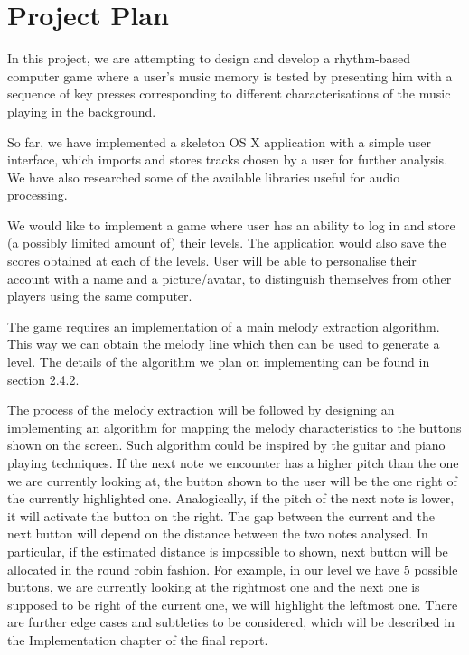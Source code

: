 
\chapter{Project Plan} %

\label{Chapter3} %




In this project, we are attempting to design and develop a rhythm-based computer game where a user's music memory is tested  by presenting him with a sequence of key presses corresponding to different characterisations of the music playing in the background.

So far, we have implemented a skeleton OS X application with a simple user interface, which imports and stores tracks chosen by a user for further analysis. We have also researched some of the available libraries useful for audio processing.

We would like to implement a game where user has an ability to log in and store  (a possibly limited amount of) their levels. The application would also save the scores obtained at each of the levels. User will be able to personalise their account with a name and a picture/avatar, to distinguish themselves from other players using the same computer.

The game requires an implementation of a main melody extraction algorithm. This way we can obtain the melody line which then can be used to generate a level. The details of the algorithm we plan on implementing can be found in section 2.4.2.

The process of the melody extraction will be followed by designing an implementing an algorithm for mapping the melody characteristics to the buttons shown on the screen. Such algorithm could be inspired by the guitar and piano playing techniques. If the next note we encounter has a higher pitch than the one we are currently looking at, the button shown to the user will be the one right of the currently highlighted one. Analogically, if the pitch of the next note is lower, it will activate the button on the right. The gap between the current and the next button will depend on the distance between the two notes analysed. In particular, if the estimated distance is impossible to shown, next button will be allocated in the round robin fashion. For example, in our level we have 5 possible buttons, we are currently looking at the rightmost one and the next one is supposed to be right of the current one, we will highlight the leftmost one. There are further edge cases and subtleties to be considered, which will be described in the Implementation chapter of the final report.

